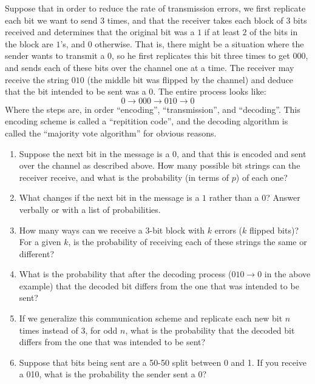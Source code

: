 \begin{enumerate}
Suppose that in order to reduce the rate of transmission errors, we first replicate each bit we want to send 3 times, and that the receiver takes each block of 3 bits received and determines that the original bit was a $1$ if at least $2$ of the bits in the block are $1$'s, and $0$ otherwise. That is, there might be a situation where the sender wants to transmit a $0$, so he first replicates this bit three times to get $000$, and sends each of these bits over the channel one at a time. The receiver may receive the string $010$ (the middle bit was flipped by the channel) and deduce that the bit intended to be sent was a $0$. The entire process looks like:
\[ 0 \to 000 \to 010 \to 0 \]
Where the steps are, in order ``encoding'', ``transmission'', and ``decoding''. This encoding scheme is called a ``repitition code'', and the decoding algorithm is called the ``majority vote algorithm'' for obvious reasons.

\vspace{.1in}
\begin{enumerate}
  \item Suppose the next bit in the message is a $0$, and that this is encoded and sent over the channel as described above. How many possible bit strings can the receiver receive, and what is the probability (in terms of $p$) of each one?
  \item What changes if the next bit in the message is a $1$ rather than a $0$? Answer verbally or with a list of probabilities.
  \item How many ways can we receive a 3-bit block with $k$ errors ($k$ flipped bits)? For a given $k$, is the probability of receiving each of these strings the same or different?
  \item What is the probability that after the decoding process ($010 \to 0$ in the above example) that the decoded bit differs from the one that was intended to be sent?
  \item If we generalize this communication scheme and replicate each new bit $n$ times instead of 3, for odd $n$, what is the probability that the decoded bit differs from the one that was intended to be sent?
  \item Suppose that bits being sent are a 50-50 split between 0 and 1. If you receive a 010, what is the probability the sender sent a 0?
\end{enumerate}


\end{enumerate}
